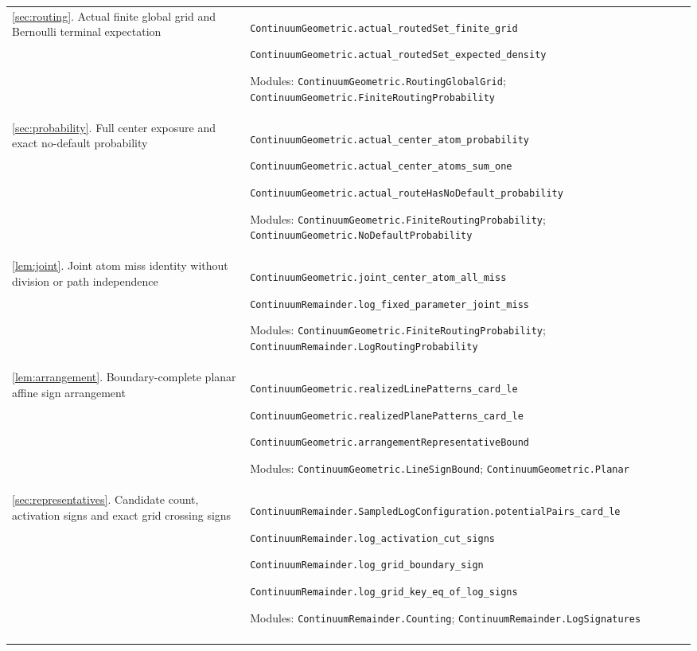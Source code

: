 \begin{longtable}{@{}p{}p{}@{}}
\ref{sec:routing}. Actual finite global grid and Bernoulli terminal expectation & \nolinkurl{ContinuumGeometric.actual_routedSet_finite_grid}\par \nolinkurl{ContinuumGeometric.actual_routedSet_expected_density}\par\smallskip Modules: \nolinkurl{ContinuumGeometric.RoutingGlobalGrid}; \nolinkurl{ContinuumGeometric.FiniteRoutingProbability} \\\addlinespace
\ref{sec:probability}. Full center exposure and exact no-default probability & \nolinkurl{ContinuumGeometric.actual_center_atom_probability}\par \nolinkurl{ContinuumGeometric.actual_center_atoms_sum_one}\par \nolinkurl{ContinuumGeometric.actual_routeHasNoDefault_probability}\par\smallskip Modules: \nolinkurl{ContinuumGeometric.FiniteRoutingProbability}; \nolinkurl{ContinuumGeometric.NoDefaultProbability} \\\addlinespace
\ref{lem:joint}. Joint atom miss identity without division or path independence & \nolinkurl{ContinuumGeometric.joint_center_atom_all_miss}\par \nolinkurl{ContinuumRemainder.log_fixed_parameter_joint_miss}\par\smallskip Modules: \nolinkurl{ContinuumGeometric.FiniteRoutingProbability}; \nolinkurl{ContinuumRemainder.LogRoutingProbability} \\\addlinespace
\ref{lem:arrangement}. Boundary-complete planar affine sign arrangement & \nolinkurl{ContinuumGeometric.realizedLinePatterns_card_le}\par \nolinkurl{ContinuumGeometric.realizedPlanePatterns_card_le}\par \nolinkurl{ContinuumGeometric.arrangementRepresentativeBound}\par\smallskip Modules: \nolinkurl{ContinuumGeometric.LineSignBound}; \nolinkurl{ContinuumGeometric.Planar} \\\addlinespace
\ref{sec:representatives}. Candidate count, activation signs and exact grid crossing signs & \nolinkurl{ContinuumRemainder.SampledLogConfiguration.potentialPairs_card_le}\par \nolinkurl{ContinuumRemainder.log_activation_cut_signs}\par \nolinkurl{ContinuumRemainder.log_grid_boundary_sign}\par \nolinkurl{ContinuumRemainder.log_grid_key_eq_of_log_signs}\par\smallskip Modules: \nolinkurl{ContinuumRemainder.Counting}; \nolinkurl{ContinuumRemainder.LogSignatures} \\\addlinespace

\end{longtable}

